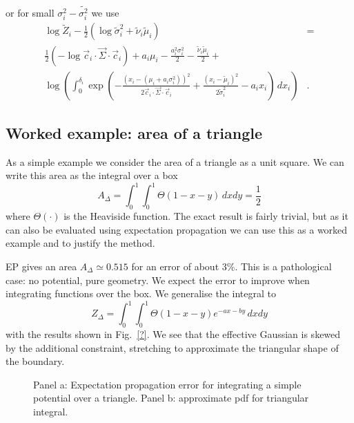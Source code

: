 \documentclass[11pt,twoside]{report}
\begin{document}
or for small $\sigma_i^2 - \tilde{\sigma_i^2}$ we use
\begin{equation}
  \begin{split}
  \log{\tilde{Z}_i}
  - \frac{1}{2}
  \left(
  \log{\tilde{\sigma}_i^2}
  + \tilde{\nu}_i \tilde{\mu}_i
  \right)
  &= \\
  \frac{1}{2} \left( -\log{\vec{c}_i \cdot \vec{\Sigma} \cdot \vec{c}_i} \right)
  + a_i \mu_i
  - \frac{a_i^2 \sigma_i^2}{2}
  - \frac{\tilde{\nu}_i \tilde{\mu}_i}{2}
  + & \\
  \log{\left(
  \int_0^{\delta_i}
  \exp{\left( -\frac{(x_i - (\mu_i + a_i \sigma_i^2))^2}{2 \vec{c}_i \cdot \vec{\Sigma} \cdot \vec{c}_i} +
    \frac{(x_i - \tilde{\mu}_i)^2}{2 \tilde{\sigma}_i^2} -a_i x_i \right)} \, dx_i \right)}&.
  \end{split}
\end{equation}


\subsection{Worked example: area of a triangle}

As a simple example we consider the area of a triangle as a unit square.
We can write this area as the integral over a box
\begin{equation}
  A_\Delta
  = \int_0^1 \int_0^1 \Theta(1 - x - y) \, dx dy
  = \frac{1}{2}
\end{equation}
where $\Theta(\cdot)$ is the Heaviside function.
The exact result is fairly trivial, but as it can also be evaluated using expectation propagation we can use this as a worked example and to justify the method.

EP gives an area $A_\Delta \simeq 0.515$ for an error of about 3\%.
This is a pathological case: no potential, pure geometry.
We expect the error to improve when integrating functions over the box.
We generalise the integral to
\begin{equation}
  Z_\Delta
  = \int_0^1 \int_0^1 \Theta(1 - x - y) e^{-ax - by} \, dx dy
\end{equation}
with the results shown in Fig.\ \ref{?}.
We see that the effective Gaussian is skewed by the additional constraint, stretching to approximate the triangular shape of the boundary.

\begin{figure}
  \missingfigure[figwidth=\linewidth]{}
  \caption{Panel a: Expectation propagation error for integrating a simple potential over a triangle.
  Panel b: approximate pdf for triangular integral.}
\end{figure}
\end{document}
